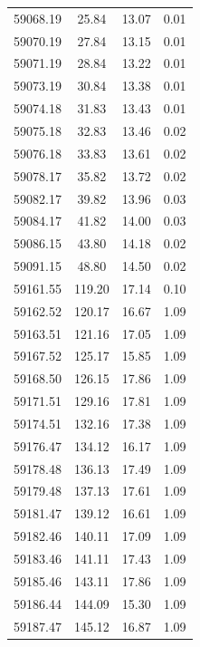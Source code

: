 \begin{longtable}{|c|c|c|c|}
 59068.19 &   25.84 &       13.07 &          0.01 \\
 59070.19 &   27.84 &       13.15 &          0.01 \\
 59071.19 &   28.84 &       13.22 &          0.01 \\
 59073.19 &   30.84 &       13.38 &          0.01 \\
 59074.18 &   31.83 &       13.43 &          0.01 \\
 59075.18 &   32.83 &       13.46 &          0.02 \\
 59076.18 &   33.83 &       13.61 &          0.02 \\
 59078.17 &   35.82 &       13.72 &          0.02 \\
 59082.17 &   39.82 &       13.96 &          0.03 \\
 59084.17 &   41.82 &       14.00 &          0.03 \\
 59086.15 &   43.80 &       14.18 &          0.02 \\
 59091.15 &   48.80 &       14.50 &          0.02 \\
 59161.55 &  119.20 &       17.14 &          0.10 \\
 59162.52 &  120.17 &       16.67 &          1.09 \\
 59163.51 &  121.16 &       17.05 &          1.09 \\
 59167.52 &  125.17 &       15.85 &          1.09 \\
 59168.50 &  126.15 &       17.86 &          1.09 \\
 59171.51 &  129.16 &       17.81 &          1.09 \\
 59174.51 &  132.16 &       17.38 &          1.09 \\
 59176.47 &  134.12 &       16.17 &          1.09 \\
 59178.48 &  136.13 &       17.49 &          1.09 \\
 59179.48 &  137.13 &       17.61 &          1.09 \\
 59181.47 &  139.12 &       16.61 &          1.09 \\
 59182.46 &  140.11 &       17.09 &          1.09 \\
 59183.46 &  141.11 &       17.43 &          1.09 \\
 59185.46 &  143.11 &       17.86 &          1.09 \\
 59186.44 &  144.09 &       15.30 &          1.09 \\
 59187.47 &  145.12 &       16.87 &          1.09 \\

\end{longtable}
